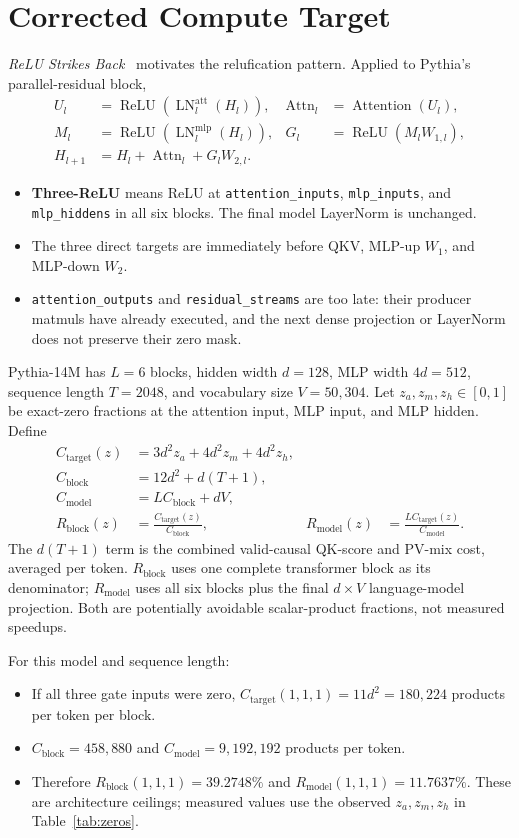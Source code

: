 \documentclass[10pt]{article}
\newcommand{\code}[1]{\texttt{#1}}
\newcommand{\pct}{\%}
\newcommand{\tightsection}[1]{\section{#1}\vspace{-0.35em}}
\begin{document}
\clearpage
\tightsection{Corrected Compute Target}

\textit{ReLU Strikes Back}~\cite{mirzadeh2023} motivates the relufication pattern. Applied to Pythia's parallel-residual block,
\begin{align*}
U_l &= \operatorname{ReLU}(\operatorname{LN}^{\mathrm{att}}_l(H_l)),
& \operatorname{Attn}_l &= \operatorname{Attention}(U_l),\\
M_l &= \operatorname{ReLU}(\operatorname{LN}^{\mathrm{mlp}}_l(H_l)),
& G_l &= \operatorname{ReLU}(M_lW_{1,l}),\\
H_{l+1} &= H_l+\operatorname{Attn}_l+G_lW_{2,l}.
\end{align*}
\begin{itemize}[leftmargin=1.3em]
\item \textbf{Three-ReLU} means ReLU at \code{attention\_inputs}, \code{mlp\_inputs}, and \code{mlp\_hiddens} in all six blocks. The final model LayerNorm is unchanged.
\item The three direct targets are immediately before QKV, MLP-up $W_1$, and MLP-down $W_2$.
\item \code{attention\_outputs} and \code{residual\_streams} are too late: their producer matmuls have already executed, and the next dense projection or LayerNorm does not preserve their zero mask.
\end{itemize}

Pythia-14M has $L=6$ blocks, hidden width $d=128$, MLP width $4d=512$, sequence length $T=2048$, and vocabulary size $V=50{,}304$. Let $z_a,z_m,z_h\in[0,1]$ be exact-zero fractions at the attention input, MLP input, and MLP hidden. Define
\begin{align*}
C_{\mathrm{target}}(z)&=3d^2z_a+4d^2z_m+4d^2z_h,\\
C_{\mathrm{block}}&=12d^2+d(T+1),\\
C_{\mathrm{model}}&=LC_{\mathrm{block}}+dV,\\
R_{\mathrm{block}}(z)&=\frac{C_{\mathrm{target}}(z)}{C_{\mathrm{block}}},
& R_{\mathrm{model}}(z)&=\frac{LC_{\mathrm{target}}(z)}{C_{\mathrm{model}}}.
\end{align*}
The $d(T+1)$ term is the combined valid-causal QK-score and PV-mix cost, averaged per token. $R_{\mathrm{block}}$ uses one complete transformer block as its denominator; $R_{\mathrm{model}}$ uses all six blocks plus the final $d\times V$ language-model projection. Both are potentially avoidable scalar-product fractions, not measured speedups.

For this model and sequence length:
\begin{itemize}[leftmargin=1.3em]
\item If all three gate inputs were zero, $C_{\mathrm{target}}(1,1,1)=11d^2=180{,}224$ products per token per block.
\item $C_{\mathrm{block}}=458{,}880$ and $C_{\mathrm{model}}=9{,}192{,}192$ products per token.
\item Therefore \textbf{$R_{\mathrm{block}}(1,1,1)=39.2748\pct{}$} and \textbf{$R_{\mathrm{model}}(1,1,1)=11.7637\pct{}$}. These are architecture ceilings; measured values use the observed $z_a,z_m,z_h$ in Table~\ref{tab:zeros}.
\end{itemize}
\end{document}
